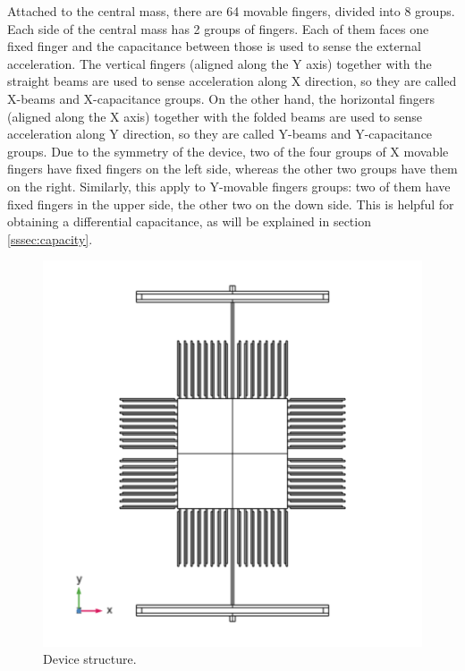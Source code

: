 \documentclass[lettersize,journal]{IEEEtran}
\begin{document}
        Attached to the central mass, there are 64 movable fingers, divided into 8 groups. Each side of the central mass has 2 groups of fingers. Each of them faces one fixed finger and the capacitance between those is used to sense the external acceleration. The vertical fingers (aligned along the Y axis) together with the straight beams are used to sense acceleration along X direction, so they are called X-beams and X-capacitance groups. On the other hand, the horizontal fingers (aligned along the X axis) together with the folded beams are used to sense acceleration along Y direction, so they are called Y-beams and Y-capacitance groups. Due to the symmetry of the device, two of the four groups of X movable fingers have fixed fingers on the left side, whereas the other two groups have them on the right. Similarly, this apply to Y-movable fingers groups: two of them have fixed fingers in the upper side, the other two on the down side. This is helpful for obtaining a differential capacitance, as will be explained in section \ref{sssec:capacity}.
        
        
        \begin{figure}[h!]
            \centering
            \includegraphics[width=1.0\linewidth]{full_device_geometry.png}
            \caption{Device structure.}
            \label{fig:dev-struct}
        \end{figure}
        
\end{document}
